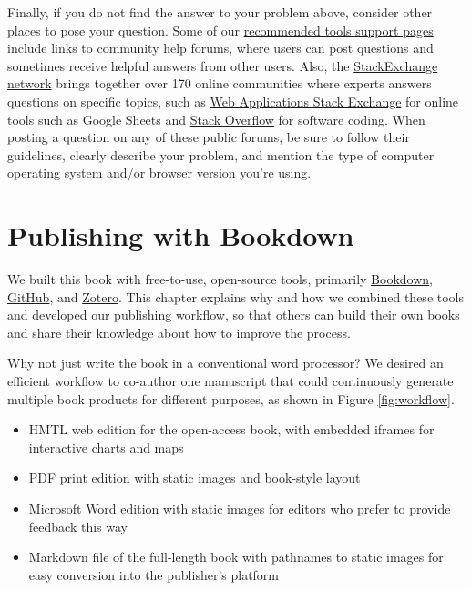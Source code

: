 \documentclass[
  english,
]{book}
\providecommand{\tightlist}{%
  \setlength{\itemsep}{0pt}\setlength{\parskip}{0pt}}
\begin{document}
Finally, if you do not find the answer to your problem above, consider other places to pose your question. Some of our \href{fix-tool.html}{recommended tools support pages} include links to community help forums, where users can post questions and sometimes receive helpful answers from other users. Also, the \href{https://stackexchange.com}{StackExchange network} brings together over 170 online communities where experts answers questions on specific topics, such as \href{https://webapps.stackexchange.com}{Web Applications Stack Exchange} for online tools such as Google Sheets and \href{https://stackoverflow.com}{Stack Overflow} for software coding. When posting a question on any of these public forums, be sure to follow their guidelines, clearly describe your problem, and mention the type of computer operating system and/or browser version you're using.

\hypertarget{bookdown}{%
\chapter{Publishing with Bookdown}\label{bookdown}}

We built this book with free-to-use, open-source tools, primarily \href{https://bookdown.org}{Bookdown}, \href{https://github.com}{GitHub}, and \href{https://zotero.org}{Zotero}. This chapter explains why and how we combined these tools and developed our publishing workflow, so that others can build their own books and share their knowledge about how to improve the process.

Why not just write the book in a conventional word processor? We desired an efficient workflow to co-author one manuscript that could continuously generate multiple book products for different purposes, as shown in Figure \ref{fig:workflow}.

\begin{itemize}
\tightlist
\item
  HMTL web edition for the open-access book, with embedded iframes for interactive charts and maps
\item
  PDF print edition with static images and book-style layout
\item
  Microsoft Word edition with static images for editors who prefer to provide feedback this way
\item
  Markdown file of the full-length book with pathnames to static images for easy conversion into the publisher's platform
\end{itemize}
\end{document}
